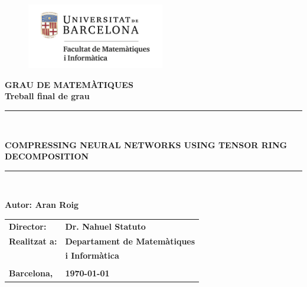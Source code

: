 \documentclass[11pt,a4paper,openright,oneside]{book}
\numberwithin{equation}{section}
\begin{document}

\thispagestyle{empty}

\begin{titlepage}
\begin{center}
\begin{figure}[htb]
\begin{center}
\includegraphics[width=6cm]{matematiquesinformatica-pos-rgb.png}
\end{center}
\end{figure}

\vspace*{1cm}
\textbf{\LARGE GRAU DE MATEM\`{A}TIQUES } \\
\vspace*{.5cm}
\textbf{\LARGE Treball final de grau} \\

\vspace*{1.5cm}
\rule{16cm}{0.1mm}\\
\begin{Huge}
\textbf{COMPRESSING NEURAL NETWORKS USING TENSOR RING DECOMPOSITION} \\
\end{Huge}
\rule{16cm}{0.1mm}\\

\vspace{1cm}

\begin{flushright}
\textbf{\LARGE Autor: Aran Roig}

\vspace*{2cm}

\renewcommand{\arraystretch}{1.5}
\begin{tabular}{ll}
\textbf{\Large Director:} & \textbf{\Large Dr. Nahuel Statuto} \\
\textbf{\Large Realitzat a:} & \textbf{\Large  Departament de Matemàtiques   } \\
 & \textbf{\Large i Informàtica} \\
\\
\textbf{\Large Barcelona,} & \textbf{\Large \today }
\end{tabular}

\end{flushright}

\end{center}



\end{titlepage}
\end{document}
